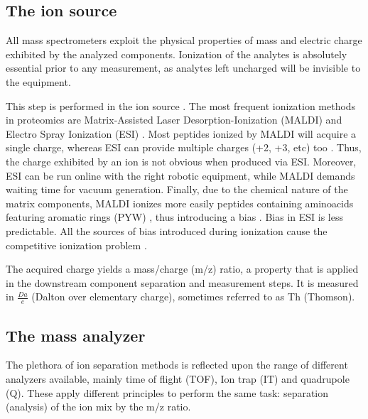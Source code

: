 
\subsection{The ion source}
\label{subsec:the_ion_source}

All mass spectrometers exploit the physical properties of mass and electric charge exhibited by the analyzed components. Ionization of the analytes is absolutely essential prior to any measurement, as analytes left uncharged will be invisible to the equipment.


This step is performed in the ion source \cite{Barsnes2008}. The most frequent ionization methods in proteomics are Matrix-Assisted Laser Desorption-Ionization (\ac{MALDI}) and Electro Spray Ionization (\ac{ESI}) \cite{Mirzaei2016}. Most peptides ionized by MALDI will acquire a single charge, whereas ESI can provide multiple charges (+2, +3, etc) too \cite{Joshi2016}. Thus, the charge exhibited by an ion is not obvious when produced via ESI. Moreover, ESI can be run online with the right robotic equipment, while MALDI demands waiting time for vacuum generation. Finally, due to the chemical nature of the matrix components, MALDI ionizes more easily peptides containing aminoacids featuring aromatic rings (PYW) \cite{Hessling2013}, thus introducing a bias \cite{Hessling2013}. Bias in ESI is less predictable. All the sources of bias introduced during ionization cause the competitive ionization problem \cite{Zhang2009} \cite{Tang2004}.

The acquired charge yields a mass/charge (\ac{m/z}) ratio, a property that is applied in the downstream component separation and measurement steps. It is measured in $\frac{Da}{e}$ (Dalton over elementary charge), sometimes referred to as Th (Thomson).

\subsection{The mass analyzer}
\label{subsec:the_mass_analyzer}

The plethora of ion separation methods is reflected upon the range of different analyzers available, mainly time of flight (\ac{TOF}), Ion trap (\ac{IT}) and quadrupole (\ac{Q}). These apply different principles to perform the same task: separation (analysis) of the ion mix by the \ac{m/z} ratio.

